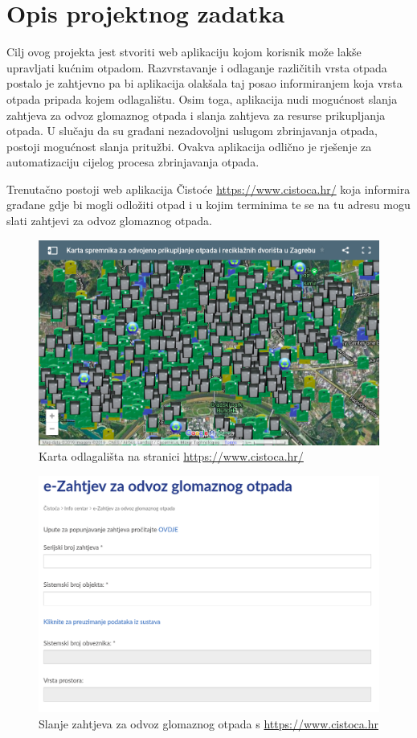 \chapter{Opis projektnog zadatka}
		
		
		Cilj ovog projekta jest stvoriti web aplikaciju kojom korisnik može lakše upravljati kućnim otpadom. Razvrstavanje i odlaganje različitih vrsta otpada postalo je zahtjevno pa bi aplikacija olakšala taj posao informiranjem koja vrsta otpada pripada kojem odlagalištu. Osim toga, aplikacija nudi mogućnost slanja zahtjeva za odvoz glomaznog otpada i slanja zahtjeva za resurse prikupljanja otpada. U slučaju da su građani nezadovoljni uslugom zbrinjavanja otpada, postoji mogućnost slanja pritužbi. Ovakva aplikacija odlično je rješenje za automatizaciju cijelog procesa zbrinjavanja otpada.
		
		Trenutačno postoji web aplikacija Čistoće \url{https://www.cistoca.hr/} koja informira građane gdje bi mogli odložiti otpad i u kojim terminima te se na tu adresu mogu slati zahtjevi za odvoz glomaznog otpada.\\
		\begin{figure}[H]
			\includegraphics[width=\linewidth]{slike/karta.png}
			\centering
			\caption{Karta odlagališta na stranici \url{https://www.cistoca.hr/}}
			\label{fig:karta}
		\end{figure}
		\begin{figure}[H]
			\includegraphics[scale=0.4]{slike/zahtjevi.png}
			\centering
			\caption{Slanje zahtjeva za odvoz glomaznog otpada s \url{https://www.cistoca.hr}}
			\label{fig:zahtjev}
		\end{figure}
		
